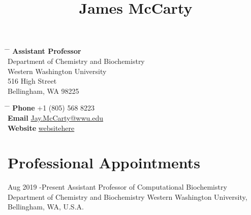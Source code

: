 \documentclass[10pt]{article} %
\begin{document}

\title{James McCarty} %


\parbox{0.5\textwidth}{ %
\begin{tabbing} %
\hspace{3cm} \= \hspace{4cm} \= \kill %
{\bf Assistant Professor} \\
Department of Chemistry and Biochemistry\\ %
Western Washington University \\
516 High Street \\ %
Bellingham, WA 98225 \\
\end{tabbing}}
\hfill %
\parbox{0.5\textwidth}{ %
\begin{tabbing} %
\hspace{3cm} \= \hspace{4cm} \= \kill %
{\bf Phone} \> +1 (805) 568 8223 \\ %
{\bf Email} \> \href{mailto:Jay.McCarty@wwu.edu}{Jay.McCarty@wwu.edu} \\ %
{\bf Website} \> \href{https://websitehere}{websitehere} \\
\end{tabbing}}


\section{Professional Appointments}

\job
{Aug 2019 -}{Present}
{Assistant Professor of Computational Biochemistry}
{Department of Chemistry and Biochemistry}
{Western Washington University, Bellingham, WA, U.S.A.}
\end{document}
